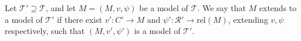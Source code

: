 Let $\mathcal{T}' \supseteq \mathcal{T}$, and let $M = (M, v, \psi)$ be a model of $\mathcal{T}$. We say that $M$ extends to a model of $\mathcal{T}'$ if there exist $v': C' \rightarrow M$ and $\psi': \mathcal{R}' \rightarrow \text{rel}(M)$, extending $v, \psi$ respectively, such that $(M, v', \psi')$ is a model of $\mathcal{T}'$.
